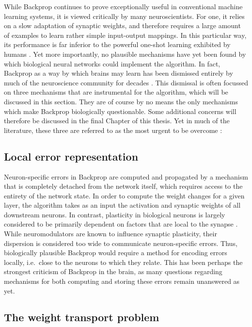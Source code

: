 While Backprop continues to prove exceptionally useful in conventional machine learning systems, it is viewed critically
by many neuroscientists. For one, it relies on a slow adaptation of synaptic weights, and therefore requires a large
amount of examples to learn rather simple input-output mappings. In this particular way, its performance is far inferior
to the powerful one-shot learning exhibited by humans \citep{Brea2016}. Yet more importantly, no plausible mechanisms
have yet been found by which biological neural networks could implement the algorithm. In fact, Backprop as a way by
which brains may learn has been dismissed entirely by much of the neuroscience community for decades
\citep{Grossberg1987,Crick1989,Mazzoni1991,OReilly1996}. This dismissal is often focussed on three mechanisms that are
instrumental for the algorithm, which will be discussed in this section. They are of course by no means the only
mechanisms which make Backprop biologically questionable. Some additional concerns will therefore be discussed in the
final Chapter of this thesis. Yet in much of the literature, these three are referred to as the most urgent to be
overcome \citep{whittington2019theories,Bengio2015,Liao2016}:


\subsection{Local error representation}

Neuron-specific errors in Backprop are computed and propagated by a mechanism that is completely detached from the
network itself, which requires access to the entirety of the network state. In order to compute the weight changes for a
given layer, the algorithm takes as an input the activation and synaptic weights of all downstream neurons. In contrast,
plasticity in biological neurons is largely considered to be primarily dependent on factors that are local to the
synapse \citep{Abbott2000,magee2020synaptic,urbanczik2014learning}. While neuromodulators are known to influence
synaptic plasticity, their dispersion is considered too wide to communicate neuron-specific errors. Thus, biologically
plausible Backprop would require a method for encoding errors locally, i.e.\ close to the neurons to which they relate.
This has been perhaps the strongest criticism of Backprop in the brain, as many questions regarding mechanisms for both
computing and storing these errors remain unanswered as yet.

\subsection{The weight transport problem}

